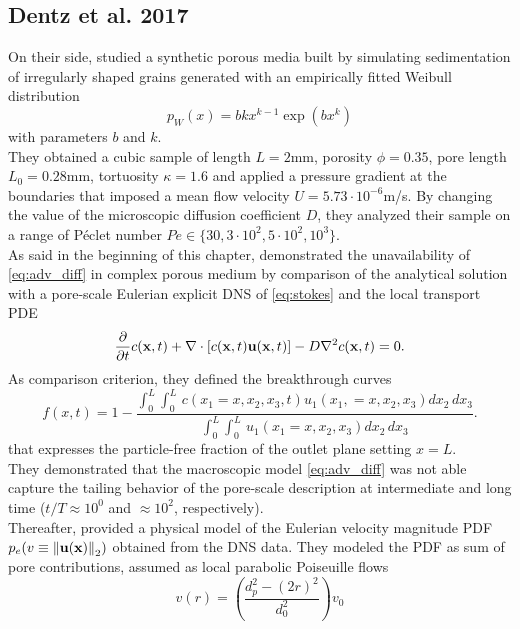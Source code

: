 \subsection{Dentz et al. 2017}
On their side, \citet{Dentz2017} studied a synthetic porous media built by simulating sedimentation of irregularly shaped grains generated with an empirically fitted Weibull distribution
\begin{equation}\label{eq:weibull}
	p_W(x)=bkx^{k-1}\exp(bx^k)
\end{equation}
with parameters $b$ and $k$.\\
They obtained a cubic sample of length $L=2$mm, porosity $\phi=0.35$, pore length $L_0=0.28$mm, tortuosity $\kappa=1.6$ and applied a pressure gradient at the boundaries that imposed a mean flow velocity $U=5.73\cdot10^{-6}$m/s. By changing the value of the microscopic diffusion coefficient $D$, they analyzed their sample on a range of Péclet number $Pe\in\{30, 3\cdot10^2, 5\cdot10^2, 10^3\}$.\\
As said in the beginning of this chapter, \citeauthor{Dentz2017} demonstrated the unavailability of \eqref{eq:adv_diff} in complex porous medium by comparison of the analytical solution with a pore-scale Eulerian explicit DNS of \eqref{eq:stokes} and the local transport PDE
\begin{equation}\label{eq:micro_adv_diff}
\pdv{t}c(\textbf{x},t)+\nabla\cdot[c(\textbf{x},t)\textbf{u}(\textbf{x},t)]-D \nabla^2c(\textbf{x},t)=0.
\end{equation}
As comparison criterion, they defined the breakthrough curves
\[
f(x,t)=1-\frac{\int_0^L\int_0^L\,c(x_1=x, x_2,x_3,t)u_1(x_1,=x,x_2,x_3)dx_2\,dx_3}{\int_0^L\int_0^L\,u_1(x_1=x,x_2,x_3)dx_2\,dx_3}.
\]
that expresses the particle-free fraction of the outlet plane setting $x=L$.\\
They demonstrated that the macroscopic model \eqref{eq:adv_diff} was not able capture the tailing behavior of the pore-scale description at intermediate and long time ($t/T\approx 10^0$ and $\approx 10^2$, respectively).\\
Thereafter, \citeauthor{Dentz2017} provided a physical model of the Eulerian velocity magnitude PDF $p_e(v\equiv\norm{\textbf{u}(\textbf{x})}_2)$  obtained from the DNS data. 
They modeled the PDF as sum of pore contributions, assumed as local parabolic Poiseuille flows 
\begin{equation}\label{eq:dentz_poiseuille}
v(r)=\left(\frac{d_p^2-(2r)^2}{d_0^2}\right)v_0
\end{equation}
